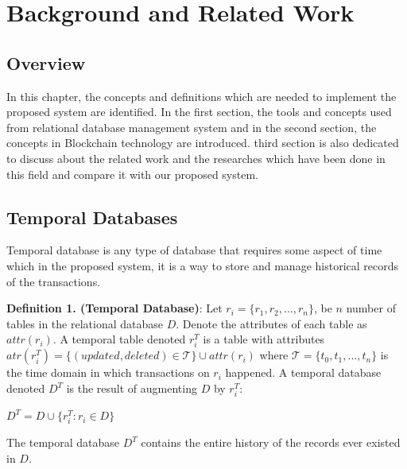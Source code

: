 \chapter{Background and Related Work}

\section{Overview}

In this chapter, the concepts and definitions which are needed to implement the proposed system are identified. In the first section, the tools and concepts used from relational database management system and in the second section, the concepts in Blockchain technology are introduced. third section is also dedicated to discuss about the related work and the researches which have been done in this field and compare it with our proposed system.

\section{Temporal Databases}
Temporal database is any type of database that requires some aspect of time \cite {elmasri2010fundamentalsofdatabase} which in the proposed system, it is a way to store and manage historical records of the transactions.


\textbf {Definition 1. (Temporal Database)}:
Let $ r_i = \{r_1, r_2, ... , r_n \}$, be $n$ number of tables in the relational database $D$. Denote the attributes of each table as $attr(r_i)$. A temporal table denoted $r_i^T$ is a table with attributes $atr(r_i^T) = \{ (updated, deleted) \in \mathcal{T} \}\cup attr(r_i)$ where $\mathcal{T} = \{t_0,t_1,...,t_n\}$ is the time domain in which transactions on $r_i$ happened. A temporal database denoted $D^T$ is the result of augmenting $D$ by $r_i^T$:

\begin{center}
	{$D^T = D \cup \{{r_i^T}: r_i \in D \}$}
\end{center}

The temporal database $D^T$ contains the entire history of the records ever existed in $D$.

